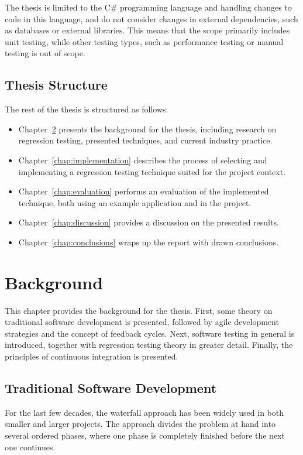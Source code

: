 \documentclass[a4paper,english,12pt]{report}
\let\Chapter\chapter
\def\chapter{\addtocontents{lol}{\protect\addvspace{10pt}}\Chapter}
\begin{document}
The thesis is limited to the C\# programming language and handling changes to code in this language, and do not consider changes in external dependencies, such as databases or external libraries. This means that the scope primarily includes unit testing, while other testing types, such as performance testing or manual testing is out of scope.

\section{Thesis Structure}
The rest of the thesis is structured as follows.

\begin{itemize}
  \item Chapter~\ref{chap:background} presents the background for the thesis, including research on regression testing, presented techniques, and current industry practice.
  \item Chapter~\ref{chap:implementation} describes the process of selecting and implementing a regression testing technique suited for the project context.
  \item Chapter~\ref{chap:evaluation} performs an evaluation of the implemented technique, both using an example application and in the project. 
  \item Chapter~\ref{chap:discussion} provides a discussion on the presented results.
  \item Chapter~\ref{chap:conclusions} wraps up the report with drawn conclusions.
\end{itemize}

\chapter{Background}\label{chap:background}
This chapter provides the background for the thesis. First, some theory on traditional software development is presented, followed by agile development strategies and the concept of feedback cycles. Next, software testing in general is introduced, together with regression testing theory in greater detail. Finally, the principles of continuous integration is presented.

\section{Traditional Software Development}\label{sec:traditional-software-development}
For the last few decades, the waterfall approach has been widely used in both smaller and larger projects. The approach divides the problem at hand into several ordered phases, where one phase is completely finished before the next one continues. \citep[p. 16]{stober2009agile}
\end{document}
